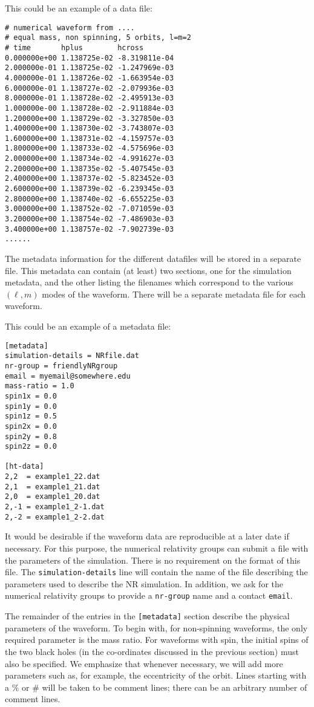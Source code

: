 \documentclass[prd,preprintnumbers,superscriptaddress,eqsecnum]{revtex4}
\numberwithin{equation}{section}
\begin{document}
This could be an example of a data file:

\begin{verbatim}
# numerical waveform from ....
# equal mass, non spinning, 5 orbits, l=m=2
# time       hplus        hcross
0.000000e+00 1.138725e-02 -8.319811e-04
2.000000e-01 1.138725e-02 -1.247969e-03
4.000000e-01 1.138726e-02 -1.663954e-03
6.000000e-01 1.138727e-02 -2.079936e-03
8.000000e-01 1.138728e-02 -2.495913e-03
1.000000e-00 1.138728e-02 -2.911884e-03
1.200000e+00 1.138729e-02 -3.327850e-03
1.400000e+00 1.138730e-02 -3.743807e-03
1.600000e+00 1.138731e-02 -4.159757e-03
1.800000e+00 1.138733e-02 -4.575696e-03
2.000000e+00 1.138734e-02 -4.991627e-03
2.200000e+00 1.138735e-02 -5.407545e-03
2.400000e+00 1.138737e-02 -5.823452e-03
2.600000e+00 1.138739e-02 -6.239345e-03
2.800000e+00 1.138740e-02 -6.655225e-03
3.000000e+00 1.138752e-02 -7.071059e-03
3.200000e+00 1.138754e-02 -7.486903e-03
3.400000e+00 1.138757e-02 -7.902739e-03
......
\end{verbatim}

The metadata information for the different datafiles will be stored in a
separate file.  This metadata can contain (at least) two sections,
one for the simulation metadata, and the other listing the filenames
which correspond to the various $(\ell,m)$ modes of the waveform.  There
will be a separate metadata file for each waveform.

This could be an example of a metadata file:

\begin{verbatim}
[metadata]
simulation-details = NRfile.dat
nr-group = friendlyNRgroup
email = myemail@somewhere.edu
mass-ratio = 1.0
spin1x = 0.0
spin1y = 0.0
spin1z = 0.5
spin2x = 0.0
spin2y = 0.8
spin2z = 0.0

[ht-data]
2,2  = example1_22.dat
2,1  = example1_21.dat
2,0  = example1_20.dat
2,-1 = example1_2-1.dat
2,-2 = example1_2-2.dat
\end{verbatim}

It would be desirable if the waveform data are reproducible at a later
date if necessary.  For this purpose, the numerical relativity groups
can submit a file with the parameters of the simulation.  There is no
requirement on the format of this file.  The
\texttt{simulation-details} line will contain the name of the file
describing the parameters used to describe the NR simulation.  In
addition, we ask for the numerical relativity groups to provide a
\texttt{nr-group} name and a contact \texttt{email}.

The remainder of the entries in the \texttt{[metadata]} section
describe the physical parameters of the waveform.  To begin with, for
non-spinning waveforms, the only required parameter is the mass ratio.
For waveforms with spin, the initial spins of the two black holes (in
the co-ordinates discussed in the previous section) must also be
specified. We emphasize that whenever necessary, we will add more
parameters such as, for example, the eccentricity of the orbit. Lines
starting with a $\%$ or $\#$ will be taken to be comment lines; there
can be an arbitrary number of comment lines.
\end{document}
